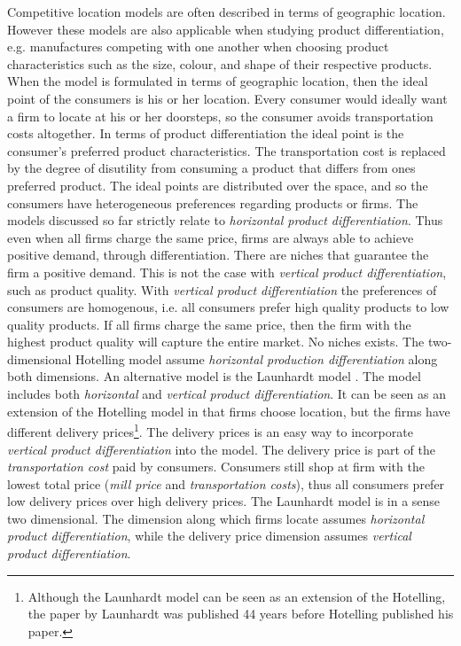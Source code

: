 \documentclass[preprint, 12pt]{elsarticle}
\begin{document}
Competitive location models are often described in terms of geographic location. However these models are also applicable when studying product differentiation, e.g. manufactures competing with one another when choosing product characteristics such as the size, colour, and shape of their respective products. When the model is formulated in terms of geographic location, then the ideal point of the consumers is his or her location. Every consumer would ideally want a firm to locate at his or her doorsteps, so the consumer avoids transportation costs altogether. In terms of product differentiation the ideal point is the consumer's preferred product characteristics. The transportation cost is replaced by the degree of disutility from consuming a product that differs from ones preferred product. The ideal points are distributed over the space, and so the consumers have heterogeneous preferences regarding products or firms. The models discussed so far strictly relate to \emph{horizontal product differentiation}. Thus even when all firms charge the same price, firms are always able to achieve positive demand, through differentiation. There are niches that guarantee the firm a positive demand. This is not the case with \emph{vertical product differentiation}, such as product quality. With \emph{vertical product differentiation} the preferences of consumers are homogenous, i.e. all consumers prefer high quality products to low quality products. If all firms charge the same price, then the firm with the highest product quality will capture the entire market. No niches exists. The two-dimensional Hotelling model assume \emph{horizontal production differentiation} along both dimensions. An alternative model is the Launhardt model \citep{Ferreira_Thisse_1996}. The model includes both \emph{horizontal} and \emph{vertical product differentiation}. It can be seen as an extension of the Hotelling model in that firms choose location, but the firms have different delivery prices\footnote{Although the Launhardt model can be seen as an extension of the Hotelling, the paper by Launhardt was published 44 years before Hotelling published his paper.}. The delivery prices is an easy way to incorporate \emph{vertical product differentiation} into the model. The delivery price is part of the \emph{transportation cost} paid by consumers. Consumers still shop at firm with the lowest total price (\emph{mill price} and \emph{transportation costs}), thus all consumers prefer low delivery prices over high delivery prices. The Launhardt model is in a sense two dimensional. The dimension along which firms locate assumes \emph{horizontal product differentiation}, while the delivery price dimension assumes \emph{vertical product differentiation}.
\end{document}

